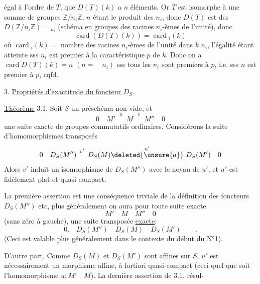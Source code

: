  égal à l'ordre de $T$, que $D(T)(k)$ a
 $n$ éléments. Or $T$ est isomorphe
à une somme de groupes $\mathbb Z/n_i\mathbb Z$, $n$ étant le
produit des $n_i$, donc $D(T)$ est 
 des $D(\mathbb Z/n_i\mathbb Z)={}_{n_i}$
(schéma en groupes des racines $n_i$-èmes de l'unité), donc
\[
 \operatorname{card}(D(T)(k))=\operatorname{card}{}_{i}(k)
\]
où $\operatorname{card}{}_{i}(k)=$ nombre des racines $n_i$-èmes de
l'unité dans $k$ \quad $n_i$, l'égalité étant atteinte sss $n_i$
est premier à la caractéristique $p$ de $k$. Donc on a
$\operatorname{card}D(T)(k)=n$
$(n=\quad n_i)$ sss tous les $n_i$ sont premiers à $p$, i.e. sss
$n$ est premier à $p$, cqfd.

3. \uline{Propriétés d'exactitude du foncteur $D_S$}.

\uline{Théorème} 3.1. Soit $S$ un préschéma non vide,
 et
\[
 0\quad M'\overset{u}{\phantom{\longrightarrow}}M
 \overset{v}{\phantom{\longrightarrow}}M''\quad0
\]
une suite exacte de groupes commutatifs ordinaires. Considérons
la suite d'homomorphismes transposés
\[
 0\quad D_S(M'')\overset{v'}{\phantom{\longrightarrow}}D_S(M)
 \overset{u'}{\deleted{\unsure{a}}}\ D_S(M')\quad0
\]
Alors $v'$ induit un isomorphisme de  $D_S(M'')$
avec le noyau de $u'$, et $u'$ est fidèlement plat et quasi-compact.

La première assertion est une conséquence triviale de la définition
des foncteurs $D_S(M'')$ etc, plus généralement on aura pour toute
suite exacte
\[
 M'\quad M\quad M''\quad0
\]
(sans zéro à gauche), une suite transposée \uline{exacte}:
\[
 0.\quad D_S(M'')\quad D_S(M)\quad D_S(M')\qquad.
\]
(Ceci est valable plus généralement dans le contexte du début du N°1).

D'autre part, Comme $D_S(M)$ et $D_S(M')$ sont affines sur $S$,
$u'$ est nécessairement un morphisme affine, à fortiori quasi-compact
(ceci quel que soit l'homomorphisme $u:M'\quad M$). La dernière assertion
de 3.1. résul-
